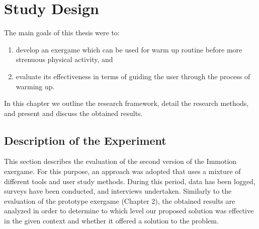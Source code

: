 \chapter{Study Design}\label{chapter:studydesign}
The main goals of this thesis were to:
\begin{enumerate}
\item develop an exergame which can be used for warm up routine before more strenuous physical activity, and
\item evaluate its effectiveness in terms of guiding the user through the process of warming up.
\end{enumerate} In this chapter we outline the research framework, detail the research methods, and present and discuss the obtained results.
\section{Description of the Experiment}
This section describes the evaluation of the second version of the Immotion exergame. For this purpose, an approach was adopted that uses a mixture of different tools and user study methods. During this period, data has been logged, surveys have been conducted, and interviews undertaken. Similarly to the evaluation of the prototype exergame (Chapter 2), the obtained results are analyzed in order to determine to which level our proposed solution was effective in the given context and whether it offered a solution to the problem. %

